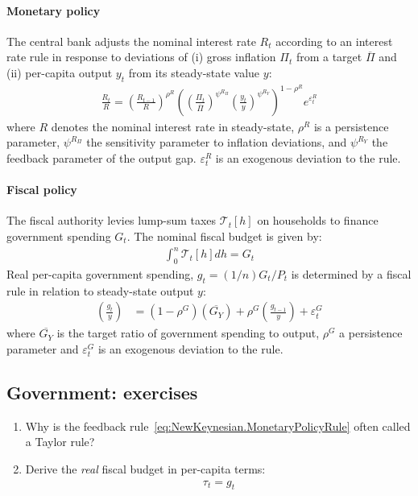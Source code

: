 \paragraph{Monetary policy}
The central bank adjusts the nominal interest rate \(R_t\) according to an interest rate rule
  in response to deviations of (i) gross inflation \(\Pi_{t}\) from a target \(\overline{\Pi}\)
  and (ii) per-capita output \(y_t\) from its steady-state value \(y\):
\begin{align}
\frac{R_{t}}{R} = {\left(\frac{R_{t-1}}{R}\right)}^{\rho^{R}} {\left({\left(\frac{\Pi_{t}}{\overline{\Pi}}\right)}^{\psi^{R_\Pi}} {\left(\frac{y_t}{y}\right)}^{\psi^{R_Y}}\right)}^{1-\rho^{R}} e^{\varepsilon^{R}_{t}} \label{eq:NewKeynesian.MonetaryPolicyRule}
\end{align}
where \(R\) denotes the nominal interest rate in steady-state,
  \(\rho^{R}\) is a persistence parameter,
  \(\psi^{R_\Pi}\) the sensitivity parameter to inflation deviations,
  and \(\psi^{R_Y}\) the feedback parameter of the output gap.
\(\varepsilon^{R}_{t}\) is an exogenous deviation to the rule.

\paragraph{Fiscal policy}
The fiscal authority levies lump-sum taxes \(\mathcal{T}_{t}[h]\) on households
  to finance government spending \(G_{t}\).
The nominal fiscal budget is given by:
\begin{align}
\int_{0}^{n} \mathcal{T}_{t}[h] dh = G_{t} \label{eq:NewKeynesian.FiscalBudgetNominal}
\end{align}
Real per-capita government spending, \(g_{t} = (1/n) G_{t}/P_{t}\) is determined by a fiscal rule
  in relation to steady-state output \(y\):
\begin{align}
\left(\frac{g_{t}}{y}\right) &= (1-\rho^{G}) \left(\overline{G_Y}\right) + \rho^{G} \left(\frac{g_{t-1}}{y}\right) + \varepsilon^{G}_{t} \label{eq:NewKeynesian.FiscalPolicyRule.spending}
\end{align}
where \(\overline{G_Y}\) is the target ratio of government spending to output,
\(\rho^{G}\) a persistence parameter
and \(\varepsilon^{G}_{t}\) is an exogenous deviation to the rule.

\subsection{Government: exercises}

\begin{enumerate}[resume]

\item
Why is the feedback rule~\eqref{eq:NewKeynesian.MonetaryPolicyRule} often called a Taylor rule?

\item
Derive the \emph{real} fiscal budget in per-capita terms:
\begin{align}
\tau_{t} = g_{t} \label{eq:NewKeynesian.FiscalBudget}
\end{align}
\end{enumerate}

